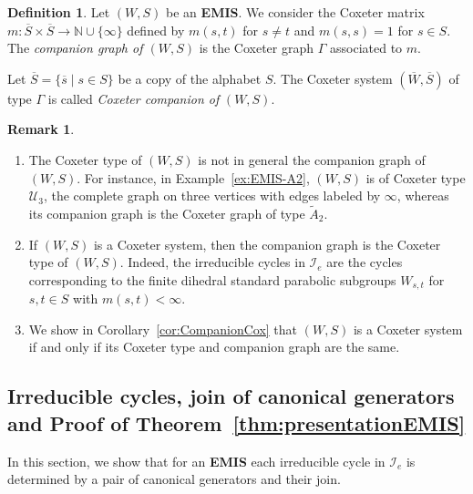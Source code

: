 \documentclass[A4paper, oneside]{amsart}
\newcommand{\N}{\mathbb{N}}
\newcommand{\id}{\textit{e}}
\newcommand{\Irr}{\mathcal{I}}
\newcommand{\U}{\mathcal{U}}
\newcommand{\EMIS}{\textnormal{\bf EMIS}\xspace}
\theoremstyle{definition}
\newtheorem{rem}[thm]{Remark}
\newtheorem{defi}[thm]{Definition}
\begin{document}
\begin{defi}
\label{def:Companion} 
Let $(W,S)$ be an \EMIS. We consider the Coxeter matrix $m: \overline{S} \times \overline{S} \to \N \cup \{\infty\}$ defined by $m(s,t)$ for $s\neq t$ and $m(s,s) = 1$ for $s\in S$. The {\em companion graph of $(W,S)$} is the Coxeter graph $\Gamma$ associated to $m$. 

\noindent Let $\overline S=\{\overline s\mid s \in S\}$ be a copy of the alphabet $S$. The Coxeter system $(\overline{W}, \overline{S})$ of type $\Gamma$ is called \emph{Coxeter companion of} $(W,S)$.
\end{defi}

\begin{rem}
\begin{enumerate}
\item The Coxeter type of $(W,S)$ is not in general the companion graph of $(W,S)$. For instance, in Example~\ref{ex:EMIS-A2}, $(W,S)$ is of Coxeter type $\U_3$, the complete graph on three vertices with edges labeled by $\infty$, whereas its companion graph is the Coxeter graph of type $\tilde A_2$. 

\item If $(W,S)$ is a Coxeter system, then the companion graph is the Coxeter type of $(W,S)$. Indeed, the irreducible cycles in $\Irr_\id$ are the cycles corresponding to the finite dihedral standard parabolic subgroups $W_{s,t}$ for $s,t\in S$ with $m(s,t)<\infty$.

\item We show in Corollary~\ref{cor:CompanionCox} that $(W,S)$ is a Coxeter system if and only if its Coxeter type and companion graph are the same.
\end{enumerate}
\end{rem}

\subsection{Irreducible cycles, join of canonical generators and Proof of Theorem~\ref{thm:presentationEMIS}}
\label{ss:IrredJoin}

In this section, we show that for an \EMIS each irreducible cycle in $\Irr_{\id}$ is determined by a pair of canonical generators and their join. 
\end{document}
